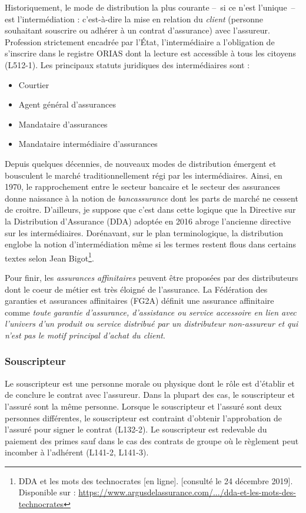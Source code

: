 \documentclass{article}
\begin{document}
Historiquement, le mode de distribution la plus courante --~si ce n'est l'unique~-- est l'intermédiation : c'est-à-dire la mise en relation du \textit{client} (personne souhaitant souscrire ou adhérer à un contrat d'assurance) avec l'assureur. Profession strictement encadrée par l'État, l'intermédiaire a l'obligation de s'inscrire dans le registre ORIAS dont la lecture est accessible à tous les citoyens (L512-1). Les principaux statuts juridiques des intermédiaires sont :

\begin{itemize}
    \item Courtier
    \item Agent général d'assurances
    \item Mandataire d'assurances
    \item Mandataire intermédiaire d'assurances
\end{itemize}

Depuis quelques décennies, de nouveaux modes de distribution émergent et bousculent le marché traditionnellement régi par les intermédiaires. Ainsi, en 1970, le rapprochement entre le secteur bancaire et le secteur des assurances donne naissance à la notion de \textit{bancassurance} dont les parts de marché ne cessent de croitre. D'ailleurs, je suppose que c'est dans cette logique que la Directive sur la Distribution d'Assurance (DDA) adoptée en 2016 abroge l'ancienne directive sur les intermédiaires. Dorénavant, sur le plan terminologique, la distribution englobe la notion d'intermédiation même si les termes restent flous dans certains textes selon Jean Bigot\footnote{DDA et les mots des technocrates
[en ligne]. [consulté le 24 décembre 2019]. Disponible sur : \href{https://www.argusdelassurance.com/juriscope/decryptages/dda-et-les-mots-des-technocrates.145990}{https://www.argusdelassurance.com/.../dda-et-les-mots-des-technocrates}}.

Pour finir, les \textit{assurances affinitaires} peuvent être proposées par des distributeurs dont le coeur de métier est très éloigné de l'assurance. La Fédération des garanties et assurances affinitaires (FG2A) définit une assurance affinitaire comme \textit{toute garantie d'assurance, d'assistance ou service accessoire en lien avec l'univers d'un produit ou service distribué par un distributeur non-assureur et qui n'est pas le motif principal d'achat du client}.

\subsubsection{Souscripteur}
Le souscripteur est une personne morale ou physique dont le rôle est d'établir et de conclure le contrat avec l'assureur. Dans la plupart des cas, le souscripteur et l'assuré sont la même personne. Lorsque le souscripteur et l'assuré sont deux personnes différentes, le souscripteur est contraint d'obtenir l'approbation de l'assuré pour signer le contrat (L132-2). Le souscripteur est redevable du paiement des primes sauf dans le cas des contrats de groupe où le règlement peut incomber à l'adhérent (L141-2, L141-3).
\end{document}
